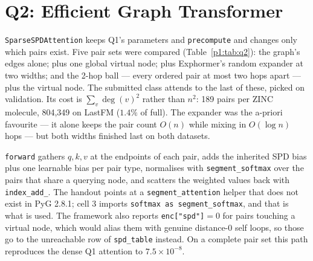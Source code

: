 \section{Q2: Efficient Graph Transformer}

\texttt{SparseSPDAttention} keeps Q1's parameters and \texttt{precompute} and changes only which
pairs exist. Five pair sets were compared (Table~\ref{p1:tab:q2}): the graph's edges
alone; plus one global virtual node; plus Exphormer's random expander at two widths; and the
2-hop ball --- every ordered pair at most two hops apart --- plus the virtual node. The
submitted class attends to the last of these, picked on validation. Its cost is
$\sum_v \deg(v)^2$ rather than $n^2$: 189 pairs per ZINC molecule, 804{,}349
on LastFM ($1.4\%$ of full). The expander was the a-priori favourite --- it alone keeps the
pair count $O(n)$ while mixing in $O(\log n)$ hops --- but both widths finished last on both
datasets.

\texttt{forward} gathers $q,k,v$ at the endpoints of each pair, adds the inherited SPD bias plus
one learnable bias per pair type, normalises with \texttt{segment\_softmax} over the pairs that
share a querying node, and scatters the weighted values back with \texttt{index\_\allowbreak{}add\_}. The
handout points at a \texttt{segment\_\allowbreak{}attention} helper that does not exist in PyG 2.8.1; cell 3
imports \texttt{softmax as\allowbreak{} segment\_\allowbreak{}softmax}, and that is what is used. The framework also
reports \texttt{enc["spd"]}$=0$ for pairs touching a virtual node, which would alias them with
genuine distance-$0$ self loops, so those go to the unreachable row of \texttt{spd\_table}
instead. On a complete pair set this path reproduces the dense Q1 attention to
$7.5\times10^{-8}$.

